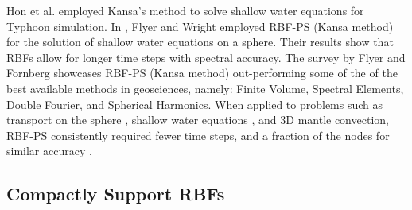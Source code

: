 \documentclass{report}
\begin{document}
{Hon et al. \cite{Hon1999} employed Kansa's method to solve shallow water equations for Typhoon simulation.
In \cite{FlyerWright09}, Flyer and Wright employed RBF-PS (Kansa method) for the solution of shallow water equations on a sphere. Their 
results show that RBFs allow for longer time steps with spectral accuracy. The survey \cite{FlyerFornberg11} by Flyer and Fornberg showcases RBF-PS (Kansa method) out-performing some of the of the best available methods in geosciences, namely: Finite Volume, Spectral Elements, Double Fourier, and Spherical Harmonics. When applied to problems such as transport on the sphere \cite{FlyerWright07}, shallow water equations \cite{FlyerWright09}, and 3D mantle convection\cite{WrightFlyerYuen10}, RBF-PS consistently required fewer time steps, and a fraction of the nodes for similar accuracy \cite{FlyerFornberg11}. 

%




\subsection{Compactly Support RBFs} 

}
\end{document}
